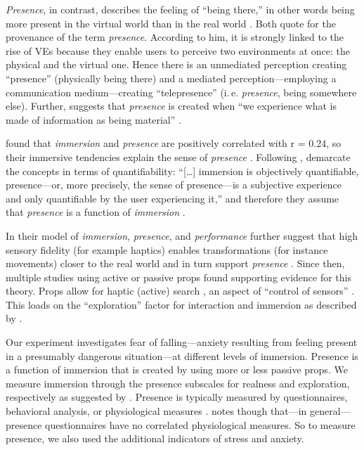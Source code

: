 \textit{Presence}, in contrast, describes the feeling of “being there,” in other words being more present in the virtual world than in the real world \autocites[\ppno~68]{McMahan2003}[based on][237]{Bowman2004}[605]{Slater1997}. Both \citeauthor{McMahan2003,Slater1997} quote \textcite{Steuer1992} for the provenance of the term \textit{presence}. According to him, it is strongly linked to the rise of \glspl{VE} because they enable users to perceive two environments at once: the physical and the virtual one. Hence there is an unmediated perception creating  “presence” (physically being there) and a mediated perception---employing a communication medium---creating “telepresence” (i.\,e. \textit{presence}, being somewhere else). Further, \textcite{Ryan1999} suggests that \textit{presence} is created when “we experience what is made of information as being material” \autocite{Lombard2000}.

\textcite{Witmer1998} found that \textit{immersion} and \textit{presence} are positively correlated with r = 0.24, so their immersive tendencies explain the sense of \textit{presence} \autocites[25]{Scharfenberger2012}[based on][238]{Witmer1998}. Following \textcites{Slater1997}, \textcite{Schubert2001} demarcate the concepts in terms of quantifiability:  “[\dots] immersion is objectively quantifiable, presence---or, more precisely, the sense of presence---is a subjective experience and only quantifiable by the user experiencing it,” and therefore they assume that \textit{presence} is a function of \textit{immersion} \autocite[267]{Schubert2001}.

In their model of \textit{immersion}, \textit{presence}, and \textit{performance} \textcite{Bystrom1999} further suggest that high sensory fidelity (for example haptics) enables transformations (for instance movements) closer to the real world and in turn support \textit{presence} \autocites{Schubert2001}[based on][]{Bystrom1999,Barfield1995a}. Since then, multiple studies using active \autocite{Vonach2017} or passive props \autocite{Insko2001} found supporting evidence for this theory. Props allow for haptic (active) search \autocite{Witmer1998}, an aspect of “control of sensors” \autocite{Sheridan1992}. This loads on the “exploration” factor for interaction and immersion as described by \textcite{Schubert2001}. 

Our experiment investigates fear of falling---anxiety resulting from feeling present in a presumably dangerous situation---at different levels of immersion. Presence is a function of immersion that is created by using more or less passive props. We measure immersion through the presence subscales for realness and exploration, respectively as suggested by \textcite{Schubert2001}. Presence is typically measured by questionnaires, behavioral analysis, or physiological measures \autocite[]{Slater2007}. \textcite{Slater2004a} notes though that---in general---presence questionnaires have no correlated physiological measures. So to measure presence, we also used the additional indicators of stress and anxiety.